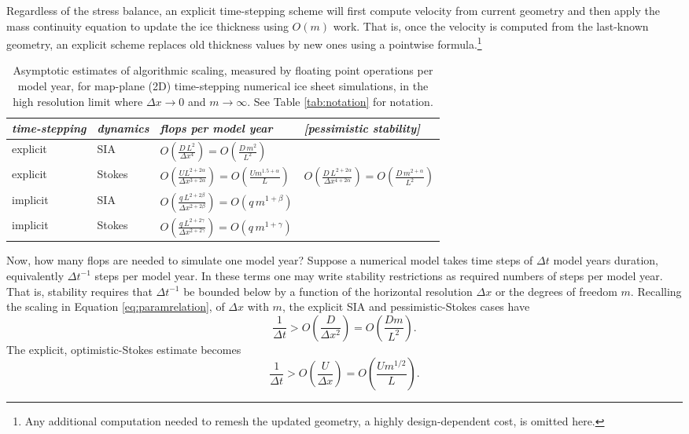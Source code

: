 \documentclass[review,letterpaper]{igs}
\begin{document}
Regardless of the stress balance, an explicit time-stepping scheme will first compute velocity from current geometry and then apply the mass continuity equation to update the ice thickness using $O(m)$ work.  That is, once the velocity is computed from the last-known geometry, an explicit scheme replaces old thickness values by new ones using a pointwise formula.\footnote{Any additional computation needed to remesh the updated geometry, a highly design-dependent cost, is omitted here.}

\newcommand{\oo}[1]{\displaystyle O\left(#1\right)}
\setlength{\tabcolsep}{5pt}
\renewcommand{\arraystretch}{1.5}
\begin{table*}[ht]
{\normalsize
\begin{tabular}{llll}
\emph{time-stepping} & \emph{dynamics} & \emph{flops per model year} & \emph{[pessimistic stability]} \\ \hline
explicit & SIA    & $\oo{\frac{D\, L^2}{\Delta x^4}} = \oo{\frac{D\, m^2}{L^2}}${\Huge \strut} \\
explicit & Stokes & $\oo{\frac{U L^{2+2\alpha}}{\Delta x^{3+2\alpha}}} = \oo{\frac{U m^{1.5+\alpha}}{L}}${\Huge \strut}\phantom{x} & $\oo{\frac{D\, L^{2+2\alpha}}{\Delta x^{4+2\alpha}}} = \oo{\frac{D\,m^{2+\alpha}}{L^2}}$ \\
implicit & SIA    & $\oo{\frac{q\, L^{2+2\beta}}{\Delta x^{2+2\beta}}} = \oo{q\, m^{1+\beta}}${\Huge \strut} \\
implicit & Stokes & $\oo{\frac{q\, L^{2+2\gamma}}{\Delta x^{2+2\gamma}}} = \oo{q\, m^{1+\gamma}}${\Huge \strut}
\end{tabular}
}
\caption{Asymptotic estimates of algorithmic scaling, measured by floating point operations per model year, for map-plane (2D) time-stepping numerical ice sheet simulations, in the high resolution limit where $\Delta x\to 0$ and $m\to\infty$.  See Table \ref{tab:notation} for notation.}
\label{tab:performancemodel}
\end{table*}

Now, how many flops are needed to simulate one model year?  Suppose a numerical model takes time steps of $\Delta t$ model years duration, equivalently $\Delta t^{-1}$ steps per model year.  In these terms one may write stability restrictions as required numbers of steps per model year.  That is, stability requires that $\Delta t^{-1}$ be bounded below by a function of the horizontal resolution $\Delta x$ or the degrees of freedom $m$.  Recalling the scaling in Equation \eqref{eq:paramrelation}, of $\Delta x$ with $m$, the explicit SIA and pessimistic-Stokes cases have
\begin{equation}
\frac{1}{\Delta t} > \oo{\frac{D}{\Delta x^2}} = \oo{\frac{D m}{L^2}}. \label{eq:explicitsiarequired}
\end{equation}
The explicit, optimistic-Stokes estimate becomes
\begin{equation}
\frac{1}{\Delta t} > \oo{\frac{U}{\Delta x}} = \oo{\frac{U m^{1/2}}{L}}. \label{eq:explicitoptstokesrequired}
\end{equation}
\end{document}
